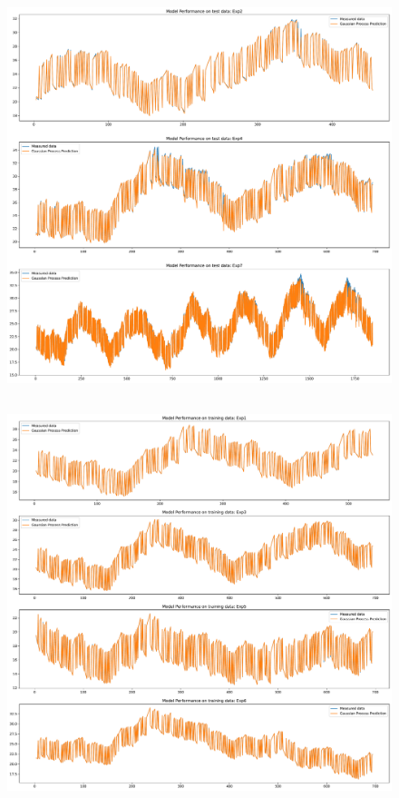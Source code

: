 \begin{figure}[ht]
    \centering
    \includegraphics[width = \textwidth]{Plots/GP_113_test_performance.pdf}
    \caption{}
    \label{fig:GP_test_validation}
\end{figure}

\clearpage

\subsection{\texorpdfstring{}{213}}

\begin{figure}[ht]
    \centering
    \includegraphics[width = \textwidth]{Plots/GP_213_training_performance.pdf}
    \caption{}
    \label{fig:GP_213_train_validation}
\end{figure}

